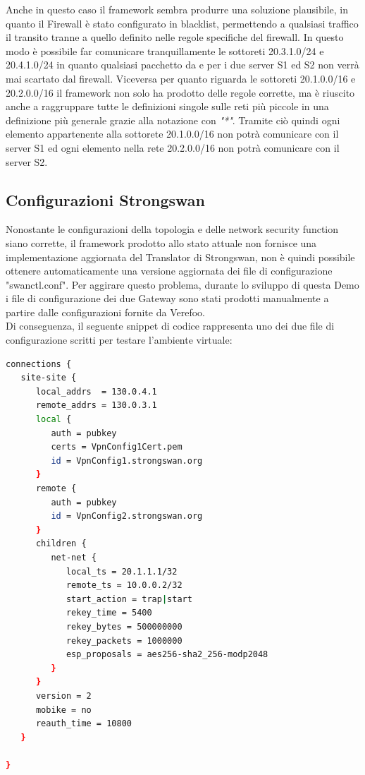 Anche in questo caso il framework sembra produrre una soluzione plausibile, in quanto il Firewall è stato configurato in blacklist, permettendo a qualsiasi traffico il transito tranne a quello 
definito nelle regole specifiche del firewall. In questo modo è possibile far comunicare tranquillamente le sottoreti 20.3.1.0/24 e 20.4.1.0/24 in quanto qualsiasi pacchetto da e per i due server S1 ed S2 non verrà
mai scartato dal firewall. Viceversa per quanto riguarda le sottoreti 20.1.0.0/16 e 20.2.0.0/16 il framework non solo ha prodotto delle regole corrette, ma è riuscito anche a raggruppare tutte le definizioni singole sulle reti più piccole in una
definizione più generale grazie alla notazione con \textit{"*"}. Tramite ciò quindi ogni elemento appartenente alla sottorete 20.1.0.0/16 non potrà comunicare con il server S1 ed ogni elemento nella rete 20.2.0.0/16 non potrà comunicare con il server S2.

\subsection{Configurazioni Strongswan}
Nonostante le configurazioni della topologia e delle network security function siano corrette, il framework prodotto allo stato attuale non fornisce una implementazione aggiornata del Translator di Strongswan, non è quindi possibile ottenere automaticamente 
una versione aggiornata dei file di configurazione "swanctl.conf". Per aggirare questo problema, durante lo sviluppo di questa Demo i file di configurazione dei due Gateway sono stati prodotti manualmente a partire dalle configurazioni fornite da Verefoo. \\
Di conseguenza, il seguente snippet di codice rappresenta uno dei due file di configurazione scritti per testare l'ambiente virtuale:

\begin{lstlisting}[language=sh]
    connections {
   site-site {
      local_addrs  = 130.0.4.1
      remote_addrs = 130.0.3.1
      local {
         auth = pubkey
         certs = VpnConfig1Cert.pem
         id = VpnConfig1.strongswan.org
      }
      remote {
         auth = pubkey
         id = VpnConfig2.strongswan.org
      }
      children {
         net-net {
            local_ts = 20.1.1.1/32            
            remote_ts = 10.0.0.2/32            
            start_action = trap|start 
            rekey_time = 5400
            rekey_bytes = 500000000
            rekey_packets = 1000000
            esp_proposals = aes256-sha2_256-modp2048
         }
      }
      version = 2
      mobike = no
      reauth_time = 10800
   }
   
}
\end{lstlisting}

